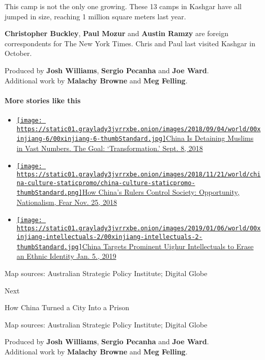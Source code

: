 This camp is not the only one growing. These 13 camps in Kashgar have
all jumped in size, reaching 1 million square meters last year.

\textbf{Christopher Buckley}, \textbf{Paul Mozur} and \textbf{Austin
Ramzy} are foreign correspondents for The New York Times. Chris and Paul
last visited Kashgar in October.

Produced by \textbf{Josh Williams}, \textbf{Sergio Pecanha} and
\textbf{Joe Ward}.\\
Additional work by \textbf{Malachy Browne} and \textbf{Meg Felling}.

\hypertarget{more-stories-like-this}{%
\paragraph{More stories like this}\label{more-stories-like-this}}

\begin{itemize}
\tightlist
\item
  \href{https://www.nytimes3xbfgragh.onion/2018/09/08/world/asia/china-uighur-muslim-detention-camp.html}{\texttt{[image: https://static01.graylady3jvrrxbe.onion/images/2018/09/04/world/00xinjiang-6/00xinjiang-6-thumbStandard.jpg]}China
  Is Detaining Muslims in Vast Numbers. The Goal: `Transformation.'
  Sept. 8, 2018}
\item
  \href{https://www.nytimes3xbfgragh.onion/interactive/2018/11/25/world/asia/china-freedoms-control.html}{\texttt{[image: https://static01.graylady3jvrrxbe.onion/images/2018/11/21/world/china-culture-staticpromo/china-culture-staticpromo-thumbStandard.png]}How
  China's Rulers Control Society: Opportunity, Nationalism, Fear Nov.
  25, 2018}
\item
  \href{https://www.nytimes3xbfgragh.onion/2019/01/05/world/asia/china-xinjiang-uighur-intellectuals.html}{\texttt{[image: https://static01.graylady3jvrrxbe.onion/images/2019/01/06/world/00xinjiang-intellectuals-2/00xinjiang-intellectuals-2-thumbStandard.jpg]}China
  Targets Prominent Uighur Intellectuals to Erase an Ethnic Identity
  Jan. 5., 2019}
\end{itemize}

Map sources: Australian Strategic Policy Institute; Digital Globe

Next

How China Turned a City Into a Prison

Map sources: Australian Strategic Policy Institute; Digital Globe

Produced by \textbf{Josh Williams}, \textbf{Sergio Pecanha} and
\textbf{Joe Ward}.\\
Additional work by \textbf{Malachy Browne} and \textbf{Meg Felling}.

